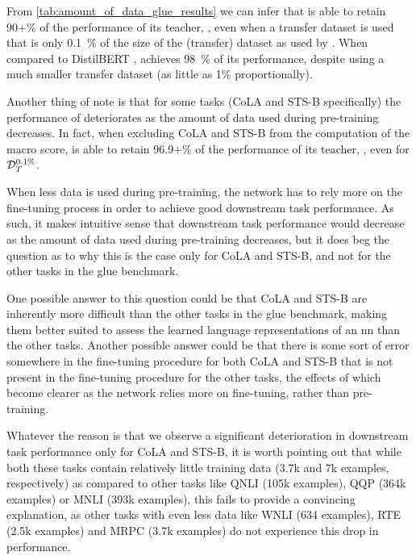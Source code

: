 From \cref{tab:amount_of_data_glue_results} we can infer that \bertstudent is able to retain 90+\% of the performance of its teacher, \bertbase \citep{devlin2018bert}, even when a transfer dataset is used that is only \SI{0.1}{\percent} of the size of the (transfer) dataset as used by \citet{devlin2018bert,sanh2019distilbert}. When compared to DistilBERT \citep{sanh2019distilbert}, \bertstudent achieves \SI{98}{\percent} of its performance, despite using a much smaller transfer dataset (as little as 1\% proportionally). 

Another thing of note is that for some tasks (CoLA and STS-B specifically) the performance of \bertstudent deteriorates as the amount of data used during pre-training decreases. In fact, when excluding CoLA and STS-B from the computation of the macro score, \bertstudent is able to retain 96.9+\% of the performance of its teacher, \bertbase, even for $\mathcal{D}_T^{0.1\%}$.

When less data is used during pre-training, the network has to rely more on the fine-tuning process in order to achieve good downstream task performance. As such, it makes intuitive sense that downstream task performance would decrease as the amount of data used during pre-training decreases, but it does beg the question as to why this is the case only for CoLA and STS-B, and not for the other tasks in the \gls{glue} benchmark.

One possible answer to this question could be that CoLA and STS-B are inherently more difficult than the other tasks in the \gls{glue} benchmark, making them better suited to assess the learned language representations of an \gls{nn} than the other tasks. 
Another possible answer could be that there is some sort of error somewhere in the fine-tuning procedure for both CoLA and STS-B that is not present in the fine-tuning procedure for the other tasks, the effects of which become clearer as the network relies more on fine-tuning, rather than pre-training.

Whatever the reason is that we observe a significant deterioration in downstream task performance only for CoLA and STS-B, it is worth pointing out that while both these tasks contain relatively little training data (3.7k and 7k examples, respectively) as compared to other tasks like QNLI (105k examples), QQP (364k examples) or MNLI (393k examples), this fails to provide a convincing explanation, as other tasks with even less data like WNLI (634 examples), RTE (2.5k examples) and MRPC (3.7k examples) do not experience this drop in performance.

